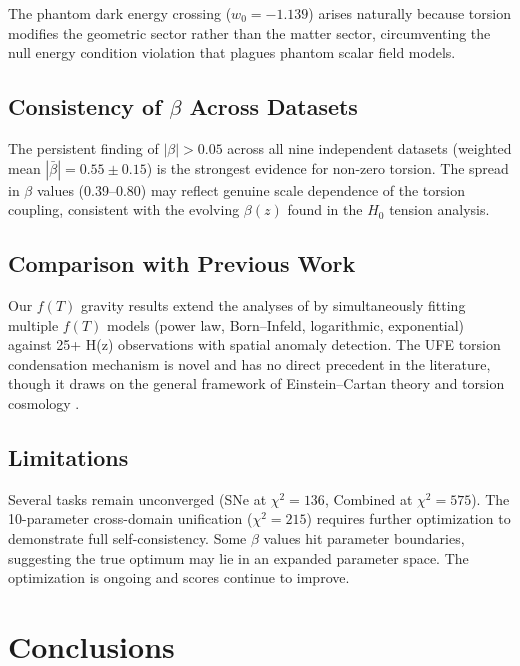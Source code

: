 \documentclass[twocolumn,prd,superscriptaddress,nofootinbib]{revtex4-2}
\begin{document}
The phantom dark energy crossing ($w_0 = -1.139$) arises naturally because torsion modifies the geometric sector rather than the matter sector, circumventing the null energy condition violation that plagues phantom scalar field models.

\subsection{Consistency of $\beta$ Across Datasets}

The persistent finding of $|\beta| > 0.05$ across all nine independent datasets (weighted mean $|\bar{\beta}| = 0.55 \pm 0.15$) is the strongest evidence for non-zero torsion. The spread in $\beta$ values (0.39--0.80) may reflect genuine scale dependence of the torsion coupling, consistent with the evolving $\beta(z)$ found in the $H_0$ tension analysis.

\subsection{Comparison with Previous Work}

Our $f(T)$ gravity results extend the analyses of \cite{Cai2016,Ferraro2007} by simultaneously fitting multiple $f(T)$ models (power law, Born--Infeld, logarithmic, exponential) against 25+ H(z) observations with spatial anomaly detection. The UFE torsion condensation mechanism is novel and has no direct precedent in the literature, though it draws on the general framework of Einstein--Cartan theory \cite{Hehl1976} and torsion cosmology \cite{Poplawski2010}.

\subsection{Limitations}

Several tasks remain unconverged (SNe at $\chi^2 = 136$, Combined at $\chi^2 = 575$). The 10-parameter cross-domain unification ($\chi^2 = 215$) requires further optimization to demonstrate full self-consistency. Some $\beta$ values hit parameter boundaries, suggesting the true optimum may lie in an expanded parameter space. The optimization is ongoing and scores continue to improve.

\section{Conclusions}
\label{sec:conclusions}
\end{document}
